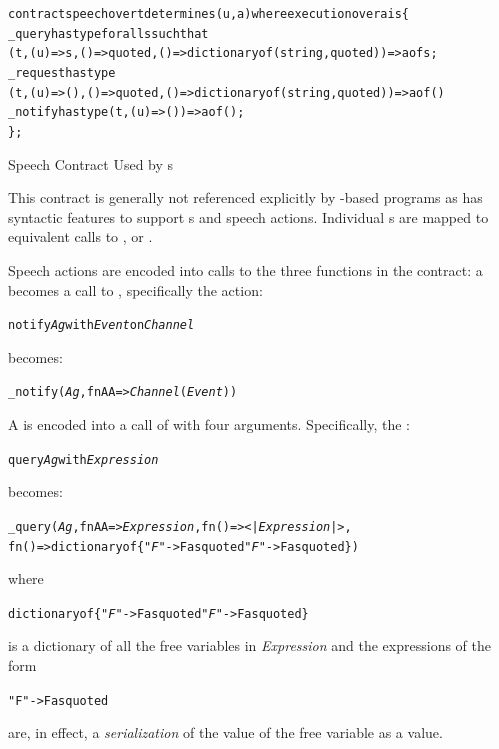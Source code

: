 \begin{program}
\begin{alltt}
contract speech over t determines (u,a) where execution over a is \{
  _query has type for all s such that 
      (t,(u)=>s,()=>quoted,()=>dictionary of (string,quoted))=> a of s;
  _request has type
      (t,(u)=>(),()=>quoted,()=>dictionary of (string,quoted)) => a of ()
  _notify has type (t,(u)=>()) => a of ();
\};
\end{alltt}
\caption{Speech Contract Used by s}
\label{speechContractProg}
\end{program}

This contract is generally not referenced explicitly by -based programs as \Sr has syntactic features to support s and speech actions. Individual s are mapped to equivalent calls to ,  or .

Speech actions are encoded into calls to the three functions in the  contract: a  becomes a call to , specifically the  action:

\begin{alltt}
notify \emph{Ag} with \emph{Event} on \emph{Channel}
\end{alltt}
becomes:
\begin{alltt}
_notify(\emph{Ag},fn AA=>\emph{Channel}(\emph{Event}))
\end{alltt}

A  is encoded into a call of  with four arguments. Specifically, the :
\begin{alltt}
query \emph{Ag} with \emph{Expression}
\end{alltt}
becomes:
\begin{alltt}
\_query(\emph{Ag},fn AA=>\emph{Expression},fn ()=><|\emph{Expression}|>,
     fn ()=> dictionary of \{"\emph{F}"->F as quoted\sequence{;}"\emph{F\subn}"->F\subn as quoted\})
\end{alltt}
where
\begin{alltt}
dictionary of \{"\emph{F}"->F as quoted\sequence{;}"\emph{F\subn}"->F\subn as quoted\}
\end{alltt}
is a dictionary of all the free variables in \emph{Expression} and the expressions of the form
\begin{alltt}
"F\subi"->F\subi as quoted
\end{alltt}
are, in effect, a \emph{serialization} of the value of the free variable as a  value.

